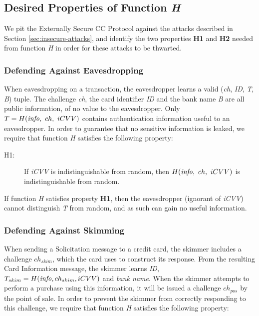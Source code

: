 \subsection{Desired Properties of Function \emph{H}}
\label{external-h-properties}

We pit the Externally Secure CC Protocol against the attacks described in Section \ref{sec:insecure-attacks},
	and identify the two properties \textbf{H1} and \textbf{H2} needed from function \emph{H} in order for these attacks to be thwarted.

\subsubsection*{Defending Against Eavesdropping}
When eavesdropping on a transaction, the eavesdropper learns a valid (\emph{ch}, \emph{ID}, \emph{T}, \emph{B}) tuple.
The challenge \emph{ch}, the card identifier \emph{ID} and the bank name \emph{B} are all public information, of no value to the eavesdropper.
Only $T = H(\textrm{\emph{info}},~ ch,~ iCVV)$ contains authentication information useful to an eavesdropper.
In order to guarantee that no sensitive information is leaked, we require that function \emph{H} satisfies the following property:

\begin{description}
\item[H1:] If \emph{iCVV} is indistinguishable from random, then $H(\textrm{\emph{info}},~ ch,~ iCVV)$ is indistinguishable from random.
\end{description}

If function \emph{H} satisfies property \textbf{H1}, then the eavesdropper (ignorant of \emph{iCVV}) cannot distinguish \emph{T} from random, and as such can gain no useful information.








\subsubsection*{Defending Against Skimming}
When sending a Solicitation message to a credit card, the skimmer includes a challenge $ch_{skim}$, which the card uses to construct its response.
From the resulting Card Information message, the skimmer learns \emph{ID}, $T_{skim} = H(\textrm{\emph{info}}, ch_{skim}, iCVV)$ and \emph{bank name}.
When the skimmer attempts to perform a purchase using this information, it will be issued a challenge $ch_{pos}$ by the point of sale.
In order to prevent the skimmer from correctly responding to this challenge, we require that function \emph{H} satisfies the following property:

